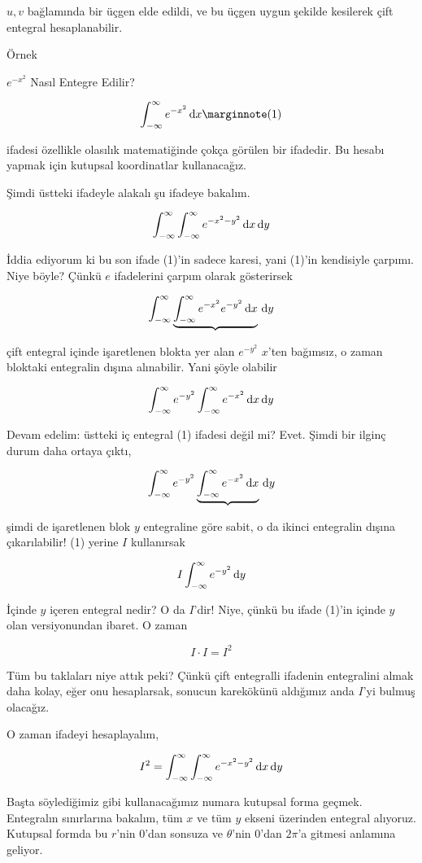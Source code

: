 \documentclass[12pt,fleqn]{article}\usepackage{../../common}
\begin{document}
$u,v$ bağlamında bir üçgen elde edildi, ve bu üçgen uygun şekilde kesilerek çift
entegral hesaplanabilir.

Örnek

$e^{-x^2}$ Nasıl Entegre Edilir? 

$$ 
\int_{-\infty}^{\infty} e^{-x^2} \ud x 
\mlabel{1} 
$$

ifadesi özellikle olasılık matematiğinde çokça görülen bir ifadedir. Bu
hesabı yapmak için kutupsal koordinatlar kullanacağız. 

Şimdi üstteki ifadeyle alakalı şu ifadeye bakalım. 

$$ \int_{-\infty}^{\infty} \int_{-\infty}^{\infty} e^{-x^2-y^2} \,\mathrm{d} x \,\mathrm{d} y $$

İddia ediyorum ki bu son ifade (1)'in sadece karesi, yani (1)'in kendisiyle
çarpımı. Niye böyle? Çünkü $e$ ifadelerini çarpım olarak gösterirsek

$$
\int_{-\infty}^{\infty} \underbrace{\int_{-\infty}^{\infty} e^{-x^2} e^{-y^2} 
\,\mathrm{d} x} \,\mathrm{d} y
$$

çift entegral içinde işaretlenen blokta yer alan $e^{-y^2}$ $x$'ten
bağımsız, o zaman bloktaki entegralin dışına alınabilir. Yani şöyle olabilir

$$
\int_{-\infty}^{\infty} e^{-y^2} \int_{-\infty}^{\infty} e^{-x^2} \,\mathrm{d} x \,\mathrm{d} y
$$

Devam edelim: üstteki iç entegral (1) ifadesi değil mi? Evet. Şimdi bir
ilginç durum daha ortaya çıktı, 

$$
\int_{-\infty}^{\infty}  e^{-y^2} 
\underbrace{\int_{-\infty}^{\infty} e^{-x^2} \,\mathrm{d} x} \,\mathrm{d} y
$$

şimdi de işaretlenen blok $y$ entegraline göre sabit, o da ikinci entegralin
dışına çıkarılabilir! (1) yerine $I$ kullanırsak

$$ I \int_{-\infty}^{\infty}  e^{-y^2} \,\mathrm{d} y $$

İçinde $y$ içeren entegral nedir? O da $I$'dir! Niye, çünkü bu ifade 
(1)'in içinde $y$ olan versiyonundan ibaret. O zaman 

$$ I \cdot I = I^2 $$

Tüm bu taklaları niye attık peki? Çünkü çift entegralli ifadenin entegralini
almak daha kolay, eğer onu hesaplarsak, sonucun karekökünü aldığımız anda $I$'yi
bulmuş olacağız.

O zaman ifadeyi hesaplayalım, 

$$
I^2 = \int_{-\infty}^{\infty} \int_{-\infty}^{\infty} e^{-x^2-y^2} \,\mathrm{d} x \,\mathrm{d} y
$$

Başta söylediğimiz gibi kullanacağımız numara kutupsal forma geçmek. Entegralın
sınırlarına bakalım, tüm $x$ ve tüm $y$ ekseni üzerinden entegral
alıyoruz. Kutupsal formda bu $r$'nin 0'dan sonsuza ve $\theta$'nin 0'dan
$2\pi$'a gitmesi anlamına geliyor.
\end{document}
